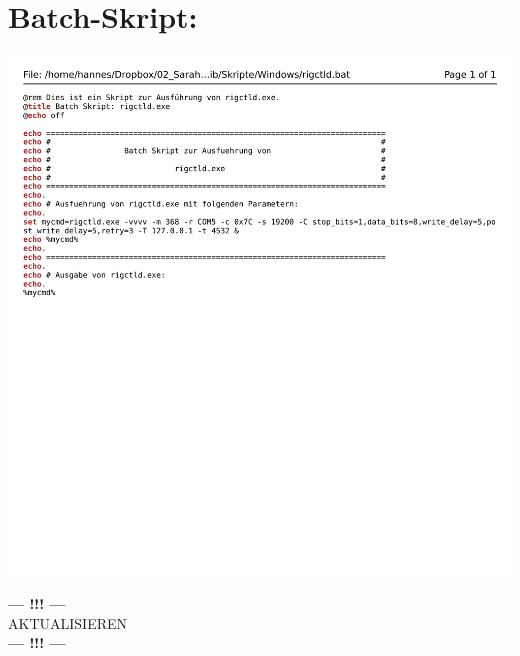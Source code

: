 
\appendix

\chapter{Batch-Skript: }
\label{chap:rigctldbat}

\begin{center}
	\includegraphics[width=1\textwidth]{./appendicies/rigctld}
\end{center}

\begin{center}
	\Large{\textbf{--- !!! ---}\\AKTUALISIEREN\\\textbf{--- !!! ---}}
\end{center}

